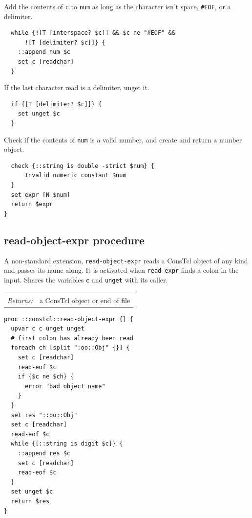 \documentclass[twoside]{report}
\begin{document}
Add the contents of \texttt{c} to \texttt{num} as long as the character isn't space, \texttt{\#EOF}, or a delimiter.

\begin{lstlisting}
  while {![T [interspace? $c]] && $c ne "#EOF" &&
      ![T [delimiter? $c]]} {
    ::append num $c
    set c [readchar]
  }
\end{lstlisting}

If the last character read is a delimiter, unget it.

\begin{lstlisting}
  if {[T [delimiter? $c]]} {
    set unget $c
  }
\end{lstlisting}

Check if the contents of \texttt{num} is a valid number, and create and return a number object.

\begin{lstlisting}
  check {::string is double -strict $num} {
      Invalid numeric constant $num
  }
  set expr [N $num]
  return $expr
}
\end{lstlisting}

\subsection{read-object-expr procedure}
\label{readobjectexpr-procedure}

A non-standard extension, \texttt{read-object-expr} reads a ConsTcl object of any kind and passes its name along. It is activated when \texttt{read-expr} finds a colon in the input. Shares the variables \texttt{c} and \texttt{unget} with its caller.

\noindent\begin{tabular}{ |p{1.9cm} p{8cm}| }
\hline
\rowcolor[HTML]{CCCCCC} \multicolumn{2}{|l|}{\bf read-object-expr (internal)} \\
\textit{Returns:} & a ConsTcl object or end of file \\
\hline
\end{tabular}

\begin{lstlisting}
proc ::constcl::read-object-expr {} {
  upvar c c unget unget
  # first colon has already been read
  foreach ch [split ":oo::Obj" {}] {
    set c [readchar]
    read-eof $c
    if {$c ne $ch} {
      error "bad object name"
    }
  }
  set res "::oo::Obj"
  set c [readchar]
  read-eof $c
  while {[::string is digit $c]} {
    ::append res $c
    set c [readchar]
    read-eof $c
  }
  set unget $c
  return $res
}
\end{lstlisting}
\end{document}
